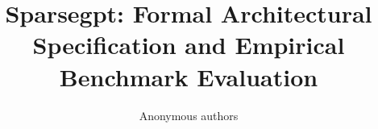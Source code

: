 \title{\textbf{Sparsegpt: Formal Architectural Specification and Empirical Benchmark Evaluation}}

\author{Anonymous authors}
